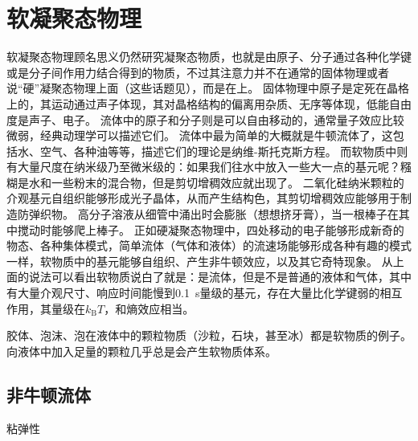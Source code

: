 \part{软凝聚态物理}

软凝聚态物理顾名思义仍然研究凝聚态物质，也就是由原子、分子通过各种化学键或是分子间作用力结合得到的物质，不过其注意力并不在通常的固体物理或者说“硬”凝聚态物理上面（这些话题见\soliddoc），而是在上。
固体物理中原子是定死在晶格上的，其运动通过声子体现，其对晶格结构的偏离用杂质、无序等体现，低能自由度是声子、电子。
流体中的原子和分子则是可以自由移动的，通常量子效应比较微弱，经典动理学可以描述它们。
流体中最为简单的大概就是牛顿流体了，这包括水、空气、各种油等等，描述它们的理论是纳维-斯托克斯方程。
而软物质中则有大量尺度在纳米级乃至微米级的：如果我们往水中放入一些大一点的基元呢？糨糊是水和一些粉末的混合物，但是剪切增稠效应就出现了。
二氧化硅纳米颗粒的介观基元自组织能够形成光子晶体，从而产生结构色，其剪切增稠效应能够用于制造防弹织物。
高分子溶液从细管中涌出时会膨胀（想想挤牙膏），当一根棒子在其中搅动时能够爬上棒子。
正如硬凝聚态物理中，四处移动的电子能够形成新奇的物态、各种集体模式，简单流体（气体和液体）的流速场能够形成各种有趣的模式一样，软物质中的基元能够自组织、产生非牛顿效应，以及其它奇特现象。
从上面的说法可以看出软物质说白了就是：是流体，但是不是普通的液体和气体，其中有大量介观尺寸、响应时间能慢到\SI{0.1}{s}量级的基元，存在大量比化学键弱的相互作用，其量级在$k_\text{B} T$，和熵效应相当。

胶体、泡沫、泡在液体中的颗粒物质（沙粒，石块，甚至冰）都是软物质的例子。向液体中加入足量的颗粒几乎总是会产生软物质体系。


\chapter{非牛顿流体}\label{chap:non-newtonian}

粘弹性
